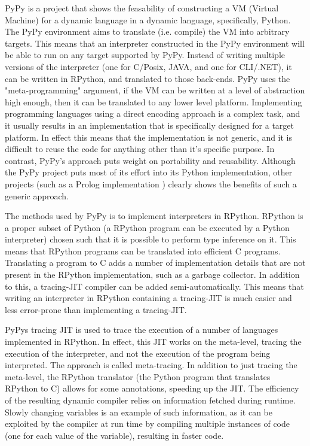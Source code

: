 PyPy is a project that shows the feasability of constructing a VM (Virtual Machine) 
for a dynamic  language in a dynamic language, specifically, Python. The PyPy 
environment aims to translate (i.e. compile) the VM into arbitrary targets. This 
means that an interpreter constructed in the PyPy environment will be able to 
run on any target supported by PyPy. Instead of writing multiple versions of 
the interpreter (one for C/Posix, JAVA, and one for CLI/.NET), it can be 
written in RPython, and translated to those back-ends. PyPy uses the 
"meta-programming" argument, if the VM can be written at a level of abstraction 
high enough, then it can be translated to any lower level platform. Implementing 
programming languages using a direct encoding approach is a complex task, and it 
usually results in an implementation that is specifically designed for a target platform. 
In effect this means that the implementation is not generic, and it is difficult to 
reuse the code for anything other than it's specific purpose. In contrast, 
PyPy's approach puts weight on portability and reusability\cite{pypy}. Although the
PyPy project puts most of its effort into its Python implementation, other projects
(such as a Prolog implementation \cite{bolz2010towards}) clearly shows the benefits of
such a generic approach.

The methods used by PyPy is to implement interpreters in RPython. RPython is a proper 
subset of Python (a RPython program can be executed by a Python interpreter) 
chosen such that it is possible to perform type inference on it. This
means that RPython programs can be translated into efficient C programs. Translating a 
program to C adds a number of implementation details that are not present in the RPython
implementation, such as a garbage collector. In addition to this, a tracing-JIT compiler 
can be added semi-automatically. This means that writing an interpreter in RPython containing
a tracing-JIT is much easier and less error-prone than implementing a tracing-JIT. 
\cite{bolz2011runtime}

PyPys tracing JIT is used to trace the execution of a number of languages implemented 
in RPython. In effect,
this JIT works on the meta-level, tracing the execution of the interpreter, and not the 
execution of the program being interpreted. The approach is called meta-tracing. In addition
to just tracing the meta-level, the RPython translator (the Python program that translates
RPython to C) allows for some annotations, speeding up the JIT. The efficiency of the 
resulting dynamic compiler relies on information fetched during runtime. Slowly changing 
variables is an example of such information, as it can be exploited by the compiler at 
run time by compiling multiple instances of code (one for each value of the variable),
resulting in faster code. \cite{bolz2011runtime}

